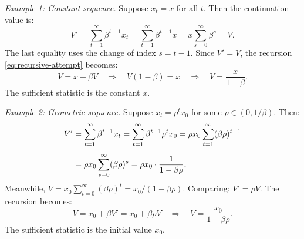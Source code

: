 \medskip
\noindent\textit{Example 1: Constant sequence.} Suppose $x_t = x$ for all $t$. Then the continuation value is:
\begin{equation}
V' = \sum_{t=1}^{\infty} \beta^{t-1} x_t = \sum_{t=1}^{\infty} \beta^{t-1} x = x \sum_{s=0}^{\infty} \beta^s = V.
\end{equation}
The last equality uses the change of index $s = t - 1$. Since $V' = V$, the recursion \cref{eq:recursive-attempt} becomes:
\begin{equation}
V = x + \beta V \quad \Longrightarrow \quad V(1 - \beta) = x \quad \Longrightarrow \quad V = \frac{x}{1 - \beta}.
\end{equation}
The sufficient statistic is the constant $x$.

\medskip
\noindent\textit{Example 2: Geometric sequence.} Suppose $x_t = \rho^t x_0$ for some $\rho \in (0, 1/\beta)$. Then:
\begin{align}
V' &= \sum_{t=1}^{\infty} \beta^{t-1} x_t = \sum_{t=1}^{\infty} \beta^{t-1} \rho^t x_0 = \rho x_0 \sum_{t=1}^{\infty} (\beta \rho)^{t-1} \notag \\[4pt]
&= \rho x_0 \sum_{s=0}^{\infty} (\beta \rho)^s = \rho x_0 \cdot \frac{1}{1 - \beta\rho}.
\end{align}
Meanwhile, $V = x_0 \sum_{t=0}^{\infty} (\beta\rho)^t = x_0 / (1 - \beta\rho)$. Comparing: $V' = \rho V$. The recursion becomes:
\begin{equation}
V = x_0 + \beta V' = x_0 + \beta \rho V \quad \Longrightarrow \quad V = \frac{x_0}{1 - \beta\rho}.
\end{equation}
The sufficient statistic is the initial value $x_0$.

